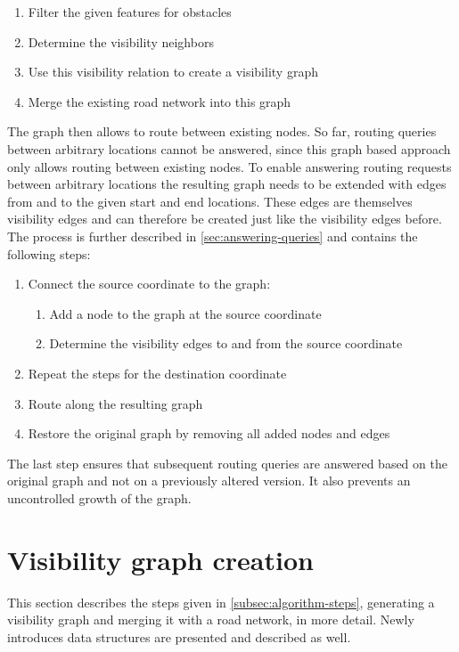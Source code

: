 		\begin{enumerate}
			\item Filter the given features for obstacles
			\item Determine the visibility neighbors
			\item Use this visibility relation to create a visibility graph
			\item Merge the existing road network into this graph
		\end{enumerate}
	
		The graph then allows to route between existing nodes.
		So far, routing queries between arbitrary locations cannot be answered, since this graph based approach only allows routing between existing nodes.
		To enable answering routing requests between arbitrary locations the resulting graph needs to be extended with edges from and to the given start and end locations.
		These edges are themselves visibility edges and can therefore be created just like the visibility edges before. The process is further described in \cref{sec:answering-queries} and contains the following steps:
		
		\begin{enumerate}
			\item Connect the source coordinate to the graph:
			\begin{enumerate}
				\item Add a node to the graph at the source coordinate
				\item Determine the visibility edges to and from the source coordinate
			\end{enumerate}
			\item Repeat the steps for the destination coordinate
			\item Route along the resulting graph
			\item Restore the original graph by removing all added nodes and edges
		\end{enumerate}
		The last step ensures that subsequent routing queries are answered based on the original graph and not on a previously altered version.
		It also prevents an uncontrolled growth of the graph.
		
\section{Visibility graph creation}
\label{sec:visibility-graph-creation}

	This section describes the steps given in \cref{subsec:algorithm-steps}, generating a visibility graph and merging it with a road network, in more detail.
	Newly introduces data structures are presented and described as well.

